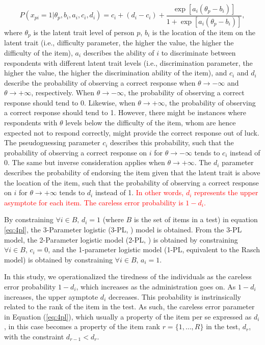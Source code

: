 \documentclass{svproc}
\newcommand{\ottavia}[1]{\textcolor{red}{#1}}
\begin{document}
\begin{equation}\label{eq:4pl}
	P(x_{pi}= 1| \theta_p, b_i, a_i, c_i, d_i) = c_i + (d_i -c_i) + \dfrac{\exp[a_i(\theta_p - b_i)]}{1 + \exp[a_i(\theta_p - b_i)]},
\end{equation}
where $\theta_p$ is the latent trait level of person $p$, $b_i$ is the location of the item on the latent trait (i.e., difficulty parameter, the higher the value, the higher the difficulty of the item), $a_i$ describes the ability of $i$ to discriminate between respondents with different latent trait levels (i.e., discrimination parameter, the higher the value, the higher the discrimination ability of the item), and $c_i$ and $d_i$ describe the probability of observing a correct response when $\theta \to - \infty$ and $\theta \to +\infty$, respectively. 
When $\theta \to - \infty$, the probability of observing a correct response should tend to 0. Likewise, when $\theta \rightarrow +\infty$, the probability of observing a correct response should tend to 1. 
However, there might be instances where respondents with $\theta$ levels below the difficulty of the item, whom are hence expected not to respond correctly, might provide the correct response out of luck. The pseudoguessing parameter $c_i$ describes this probability, such that the probability of observing a correct response on $i$ for $\theta \to - \infty$ tends to $c_i$ instead of 0. 
The same but inverse consideration applies when $\theta \to + \infty$. The $d_i$ parameter describes the probability of endorsing the item given that the latent trait is above the location of the item, such that the probability of observing a correct response on $i$ for $\theta \to + \infty$ tends to $d_i$ instead of 1. \ottavia{In other words, $d_i$ represents the upper asymptote for each item. The careless error probability is $1 - d_i$.}

By constraining $\forall i \in B, \, d_i = 1$ (where $B$ is the set of items in a test) in equation \ref{eq:4pl}, the 3-Parameter logistic (3-PL, \cite{lord:3pl}) model is obtained. From the 3-PL model, the 2-Parameter logistic model (2-PL, \cite{birnbaum}) is obtained by constraining $\forall i \in B, \, c_i = 0$, and the 1-parameter logistic model (1-PL, equivalent to the Rasch model) is obtained by constraining $\forall i \in B, \, a_i = 1$. 

\color{blue}
In this study, we operationalized the tiredness of the individuals as the careless error probability $1 - d_i$, which increases as the administration goes on. As $1 - d_i$ increases, the upper aymptote $d_i$ decreases.
This probability is instrinsically related to the rank of the item in the test. As such, the careless error parameter in Equation (\ref{eq:4pl}), which usually a property of the item per se expressed as $d_i$, in this case becomes a property of the item rank $r = \{1, \ldots, R\}$ in the test, $d_r$, with the constraint $d_{r-1} < d_r$.
\normalcolor
\end{document}
